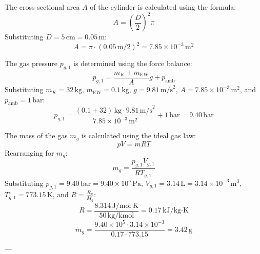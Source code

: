The cross-sectional area \( A \) of the cylinder is calculated using the formula:  
\[
A = \left( \frac{D}{2} \right)^2 \pi
\]  
Substituting \( D = 5 \, \text{cm} = 0.05 \, \text{m} \):  
\[
A = \pi \cdot \left( 0.05 \, \text{m} / 2 \right)^2 = 7.85 \times 10^{-3} \, \text{m}^2
\]  

The gas pressure \( p_{g,1} \) is determined using the force balance:  
\[
p_{g,1} = \frac{m_K + m_{\text{EW}}}{A} g + p_{\text{amb}}
\]  
Substituting \( m_K = 32 \, \text{kg} \), \( m_{\text{EW}} = 0.1 \, \text{kg} \), \( g = 9.81 \, \text{m/s}^2 \), \( A = 7.85 \times 10^{-3} \, \text{m}^2 \), and \( p_{\text{amb}} = 1 \, \text{bar} \):  
\[
p_{g,1} = \frac{(0.1 + 32) \, \text{kg} \cdot 9.81 \, \text{m/s}^2}{7.85 \times 10^{-3} \, \text{m}^2} + 1 \, \text{bar} = 9.40 \, \text{bar}
\]  

The mass of the gas \( m_g \) is calculated using the ideal gas law:  
\[
p V = m R T
\]  
Rearranging for \( m_g \):  
\[
m_g = \frac{p_{g,1} V_{g,1}}{R T_{g,1}}
\]  
Substituting \( p_{g,1} = 9.40 \, \text{bar} = 9.40 \times 10^5 \, \text{Pa} \), \( V_{g,1} = 3.14 \, \text{L} = 3.14 \times 10^{-3} \, \text{m}^3 \), \( T_{g,1} = 773.15 \, \text{K} \), and \( R = \frac{R_u}{M_g} \):  
\[
R = \frac{8.314 \, \text{J/mol·K}}{50 \, \text{kg/kmol}} = 0.17 \, \text{kJ/kg·K}
\]  
\[
m_g = \frac{9.40 \times 10^5 \cdot 3.14 \times 10^{-3}}{0.17 \cdot 773.15} = 3.42 \, \text{g}
\]  

---